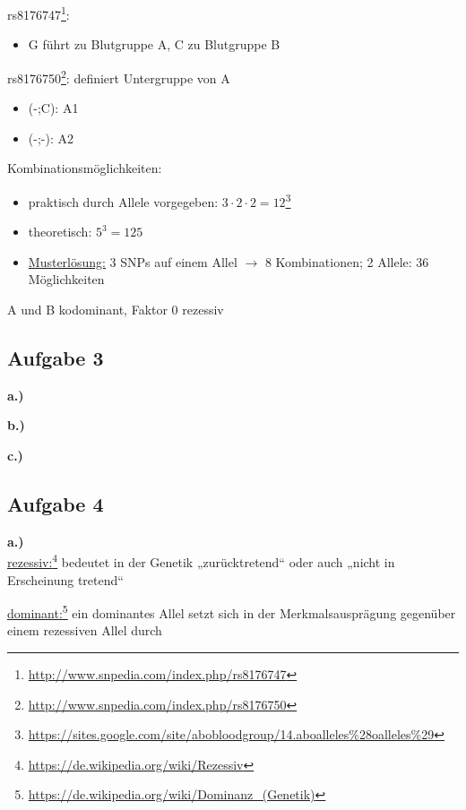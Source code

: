 \documentclass[13pt,a4paper]{article}
\begin{document}
rs8176747\footnote{\url{http://www.snpedia.com/index.php/rs8176747}}:
\begin{itemize}
	\item G führt zu Blutgruppe A, C zu Blutgruppe B
\end{itemize}

rs8176750\footnote{\url{http://www.snpedia.com/index.php/rs8176750}}: definiert Untergruppe von A
\begin{itemize}
	\item (-;C): A1
	\item (-;-): A2
\end{itemize}

Kombinationsmöglichkeiten:
\begin{itemize}
	\item praktisch durch Allele vorgegeben: $3 \cdot 2 \cdot 2 = 12$\footnote{\url{https://sites.google.com/site/abobloodgroup/14.aboalleles\%28oalleles\%29}}
	\item theoretisch: $5^3=125$
	\item \underline{Musterlösung:} 3 SNPs auf einem Allel $\rightarrow$ 8 Kombinationen; 2 Allele: 36 Möglichkeiten
\end{itemize}

A und B kodominant, Faktor 0 rezessiv

\subsection{Aufgabe 3}

\textbf{a.)}

\textbf{b.)}

\textbf{c.)}

\subsection{Aufgabe 4}

\textbf{a.)}\\
\underline{rezessiv:}\footnote{\url{https://de.wikipedia.org/wiki/Rezessiv}} bedeutet in der Genetik „zurücktretend“ oder auch „nicht in Erscheinung tretend“

\underline{dominant:}\footnote{\url{https://de.wikipedia.org/wiki/Dominanz_(Genetik)}} ein dominantes Allel setzt sich in der Merkmalsausprägung gegenüber einem rezessiven Allel durch
\end{document}
